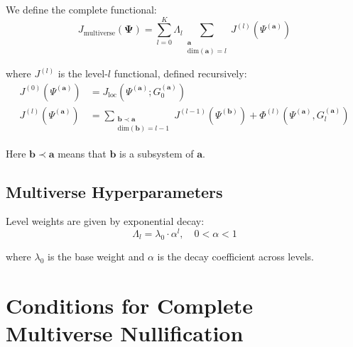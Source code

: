 \documentclass[12pt,a4paper]{article}
\newcommand{\bfPsi}{\mathbf{\Psi}}
\newcommand{\bfa}{\mathbf{a}}
\newcommand{\bfb}{\mathbf{b}}
\newcommand{\PhiFunc}{\Phi}
\begin{document}
We define the complete functional:
\begin{equation}
J_{\text{multiverse}}(\bfPsi) = \sum_{l=0}^K \Lambda_l 
\sum_{\substack{\bfa \\ \text{dim}(\bfa)=l}} J^{(l)}(\Psi^{(\bfa)})
\end{equation}

where $J^{(l)}$ is the level-$l$ functional, defined recursively:
\begin{align}
J^{(0)}(\Psi^{(\bfa)}) &= J_{\text{loc}}(\Psi^{(\bfa)}; G_0^{(\bfa)}) \\
J^{(l)}(\Psi^{(\bfa)}) &= \sum_{\substack{\bfb \prec \bfa \\ \text{dim}(\bfb)=l-1}} 
J^{(l-1)}(\Psi^{(\bfb)}) + \PhiFunc^{(l)}(\Psi^{(\bfa)}, G_l^{(\bfa)})
\end{align}

Here $\bfb \prec \bfa$ means that $\bfb$ is a subsystem of $\bfa$.

\subsection{Multiverse Hyperparameters}

Level weights are given by exponential decay:
\begin{equation}
\Lambda_l = \lambda_0 \cdot \alpha^l, \quad 0 < \alpha < 1
\end{equation}

where $\lambda_0$ is the base weight and $\alpha$ is the decay coefficient across levels.

\section{Conditions for Complete Multiverse Nullification}
\end{document}
